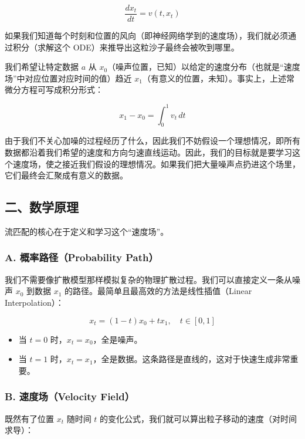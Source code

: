 \[
\frac{dx_t}{dt}=v(t,x_t)
\]

如果我们知道每个时刻和位置的风向（即神经网络学到的速度场），我们就必须通过积分（求解这个 ODE）来推导出这粒沙子最终会被吹到哪里。

我们希望让特定数据 \(a\) 从 \(x_0\)（噪声位置，已知）以给定的速度分布（也就是``速度场''中对应位置对应时间的值）趋近 \(x_1\)（有意义的位置，未知）。事实上，上述常微分方程可写成积分形式：

\[
x_1-x_0=\int_0^1 v_t\,dt
\]

由于我们不关心加噪的过程经历了什么，因此我们不妨假设一个理想情况，即所有数据都沿着我们希望的速度和方向匀速直线运动。因此，我们的目标就是要学习这个速度场，使之接近我们假设的理想情况。如果我们把大量噪声点扔进这个场里，它们最终会汇聚成有意义的数据。

\hypertarget{ux4e8cux6570ux5b66ux539fux7406}{%
\subsection{二、数学原理}\label{ux4e8cux6570ux5b66ux539fux7406}}

流匹配的核心在于定义和学习这个``速度场''。

\hypertarget{a.-ux6982ux7387ux8defux5f84probability-path}{%
\subsubsection{A. 概率路径（Probability Path）}\label{a.-ux6982ux7387ux8defux5f84probability-path}}

我们不需要像扩散模型那样模拟复杂的物理扩散过程。我们可以直接定义一条从噪声 \(x_0\) 到数据 \(x_1\) 的路径。最简单且最高效的方法是线性插值（Linear Interpolation）：

\[
x_t=(1-t)x_0+tx_1,\quad t\in[0,1]
\]

\begin{itemize}
\tightlist
\item
  当 \(t=0\) 时，\(x_t=x_0\)，全是噪声。
\item
  当 \(t=1\) 时，\(x_t=x_1\)，全是数据。这条路径是直线的，这对于快速生成非常重要。
\end{itemize}

\hypertarget{b.-ux901fux5ea6ux573avelocity-field}{%
\subsubsection{B. 速度场（Velocity Field）}\label{b.-ux901fux5ea6ux573avelocity-field}}

既然有了位置 \(x_t\) 随时间 \(t\) 的变化公式，我们就可以算出粒子移动的速度（对时间求导）：

